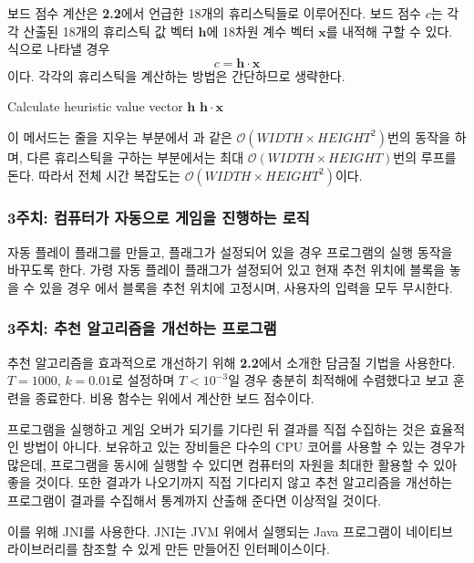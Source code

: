 보드 점수 계산은 \textbf{2.2}에서 언급한 18개의 휴리스틱들로 이루어진다. 보드 점수 $c$는 각각 산출된 18개의 휴리스틱 값 벡터 $\mathbf{h}$에
18차원 계수 벡터 $\mathbf{x}$를 내적해 구할 수 있다. 식으로 나타낼 경우
\[c = \mathbf{h} \cdot \mathbf{x}\]
이다. 각각의 휴리스틱을 계산하는 방법은 간단하므로 생략한다.

\begin{codebox}
\li Calculate heuristic value vector $\mathbf{h}$
\li \Return $\mathbf{h} \cdot \mathbf{x}$
\end{codebox}

이 메서드는 줄을 지우는 부분에서 과 같은
$\mathcal{O}\left(WIDTH \times HEIGHT^2\right)$번의 동작을 하며, 다른 휴리스틱을 구하는 부분에서는
최대 $\mathcal{O}\left(WIDTH \times HEIGHT\right)$번의 루프를 돈다. 따라서 전체 시간 복잡도는
$\mathcal{O}\left(WIDTH \times HEIGHT^2\right)$이다.

\subsubsection{3주치: 컴퓨터가 자동으로 게임을 진행하는 로직} 자동 플레이 플래그를 만들고,
플래그가 설정되어 있을 경우 프로그램의 실행 동작을 바꾸도록 한다. 가령 자동 플레이 플래그가
설정되어 있고 현재 추천 위치에 블록을 놓을 수 있을 경우 에서 블록을
추천 위치에 고정시며, 사용자의 입력을 모두 무시한다.

\subsubsection{3주치: 추천 알고리즘을 개선하는 프로그램} 추천 알고리즘을 효과적으로 개선하기 위해
\textbf{2.2}에서 소개한 담금질 기법을 사용한다. $T=1000$, $k=0.01$로 설정하며 $T<10^{-3}$일 경우
충분히 최적해에 수렴했다고 보고 훈련을 종료한다. 비용 함수는 위에서 계산한 보드 점수이다.

프로그램을 실행하고 게임 오버가 되기를 기다린 뒤 결과를 직접 수집하는 것은 효율적인 방법이 아니다. 보유하고 있는
장비들은 다수의 CPU 코어를 사용할 수 있는 경우가 많은데, 프로그램을 동시에 실행할 수 있디면 컴퓨터의 자원을
최대한 활용할 수 있아 좋을 것이다. 또한 결과가 나오기까지 직접 기다리지 않고 추천 알고리즘을 개선하는 프로그램이
결과를 수집해서 통계까지 산출해 준다면 이상적일 것이다.

이를 위해 JNI를 사용한다. JNI는 JVM
위에서 실행되는 Java 프로그램이 네이티브 라이브러리를 참조할 수 있게 만든 만들어진 인터페이스이다.

